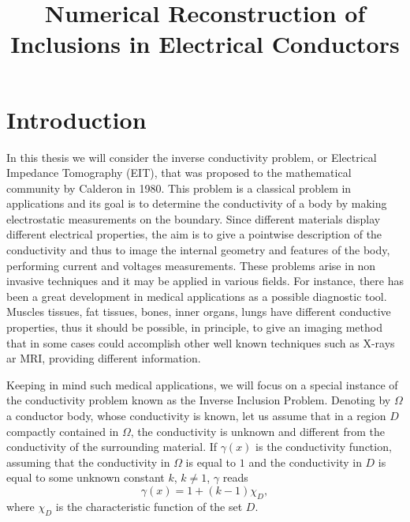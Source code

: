 \documentclass[10pt, a4paper, twoside, openright]{book}
\title{Numerical Reconstruction of Inclusions in Electrical Conductors}
\theoremstyle{definition}
\theoremstyle{plain}
\theoremstyle{plain}
\theoremstyle{plain}
\theoremstyle{plain}
\theoremstyle{plain}
\theoremstyle{plain}
\theoremstyle{plain}
\theoremstyle{plain}
\begin{document}
\maketitle
\tableofcontents
\chapter{Introduction}
In this thesis we will consider the inverse conductivity problem, or Electrical Impedance Tomography (EIT),
that was proposed to the mathematical community by Calderon \cite{Ca} in 1980.
This problem is a classical problem in applications and its goal is to determine the conductivity of a body by making electrostatic
measurements on the boundary. Since different materials display different electrical properties, the aim is to give a pointwise
description of the conductivity and thus to image the internal geometry and features of the body, performing current and voltages measurements.
These problems arise in non invasive techniques and it may be applied in various fields. For instance, there has been a
great development in medical applications as a possible diagnostic tool.
Muscles tissues, fat tissues, bones, inner organs, lungs have different conductive properties, thus it should be possible, in principle,
to give an imaging method that in some cases could accomplish other well known techniques such as X-rays ar MRI, providing different information.

Keeping in mind such medical applications, we will focus on a special instance of the conductivity problem known as the Inverse Inclusion Problem.
Denoting by $\Omega$ a conductor body, whose conductivity is known, let us assume that in a region $D$ compactly contained in $\Omega$,
the conductivity is unknown and different from the conductivity of the surrounding material. If $\gamma(x)$ is the conductivity function,
assuming that the conductivity in $\Omega$ is equal to $1$ and the conductivity in $D$ is equal to some unknown constant $k$, $k\neq1$,
$\gamma$ reads
$$\gamma(x)=1+(k-1)\chi_D,$$
where $\chi_D$ is the characteristic function of the set $D$.
\end{document}
